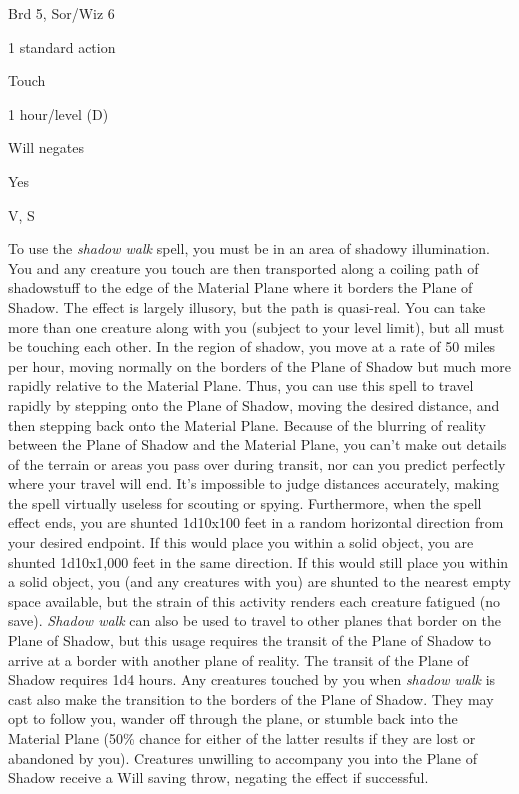 
\begin{description*}
\item[Level:] Brd 5, Sor/Wiz 6
\item[Casting Time:] 1 standard action
\item[Range:] Touch
\item[Duration:] 1 hour/level (D)
\item[Saving Throw:] Will negates
\item[Spell Resistance:] Yes
\item[Components:] V, S
\end{description*}

To use the \textit{shadow walk} spell, you must be in an area of shadowy illumination.
You and any creature you touch are then transported along a coiling path of shadowstuff
to the edge of the Material Plane where it borders the Plane of Shadow. The effect
is largely illusory, but the path is quasi-real. You can take more than one creature
along with you (subject to your level limit), but all must be touching each other.
In the region of shadow, you move at a rate of 50 miles per hour, moving normally
on the borders of the Plane of Shadow but much more rapidly relative to the Material
Plane. Thus, you can use this spell to travel rapidly by stepping onto the Plane
of Shadow, moving the desired distance, and then stepping back onto the Material
Plane.
Because of the blurring of reality between the Plane of Shadow and the Material
Plane, you can't make out details of the terrain or areas you pass over during
transit, nor can you predict perfectly where your travel will end. It's impossible
to judge distances accurately, making the spell virtually useless for scouting
or spying. Furthermore, when the spell effect ends, you are shunted 1d10x100 feet
in a random horizontal direction from your desired endpoint. If this would place
you within a solid object, you are shunted 1d10x1,000 feet in the same direction.
If this would still place you within a solid object, you (and any creatures with
you) are shunted to the nearest empty space available, but the strain of this activity
renders each creature fatigued (no save).
\textit{Shadow walk} can also be used to travel to other planes that border on
the Plane of Shadow, but this usage requires the transit of the Plane of Shadow
to arrive at a border with another plane of reality. The transit of the Plane of
Shadow requires 1d4 hours.
Any creatures touched by you when \textit{shadow walk} is cast also make the transition
to the borders of the Plane of Shadow.
They may opt to follow you, wander off through the plane, or stumble back into
the Material Plane (50\% chance for either of the latter results if they are lost
or abandoned by you). Creatures unwilling to accompany you into the Plane of Shadow
receive a Will saving throw, negating the effect if successful.